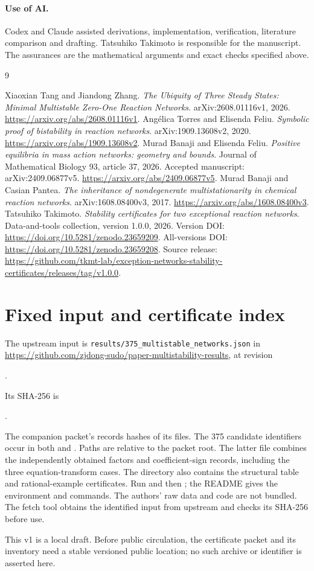 \documentclass[11pt,a4paper]{article}
\begin{document}
\paragraph{Use of AI.}
Codex and Claude assisted derivations, implementation, verification,
literature comparison and drafting. Tatsuhiko Takimoto is responsible
for the manuscript. The assurances are the mathematical arguments
and exact checks specified above.

\begin{thebibliography}{9}\raggedright
{}
Xiaoxian Tang and Jiandong Zhang.
\emph{The Ubiquity of Three Steady States: Minimal Multistable
Zero-One Reaction Networks}. arXiv:2608.01116v1, 2026.
\url{https://arxiv.org/abs/2608.01116v1}.
Ang\'elica Torres and Elisenda Feliu.
\emph{Symbolic proof of bistability in reaction networks}.
arXiv:1909.13608v2, 2020.
\url{https://arxiv.org/abs/1909.13608v2}.
Murad Banaji and Elisenda Feliu.
\emph{Positive equilibria in mass action networks: geometry and bounds}.
Journal of Mathematical Biology 93, article 37, 2026.
Accepted manuscript: arXiv:2409.06877v5.
\url{https://arxiv.org/abs/2409.06877v5}.
Murad Banaji and Casian Pantea.
\emph{The inheritance of nondegenerate multistationarity in chemical
reaction networks}. arXiv:1608.08400v3, 2017.
\url{https://arxiv.org/abs/1608.08400v3}.
Tatsuhiko Takimoto.
\emph{Stability certificates for two exceptional reaction networks}.
Data-and-tools collection, version 1.0.0, 2026.
Version DOI: \url{https://doi.org/10.5281/zenodo.23659209}.
All-versions DOI: \url{https://doi.org/10.5281/zenodo.23659208}.
Source release:
\url{https://github.com/tkmt-lab/exception-networks-stability-certificates/releases/tag/v1.0.0}.
\end{thebibliography}

\appendix
\section{Fixed input and certificate index}\label{app:input}
The upstream input is
\texttt{results/375\_multistable\_networks.json} in
\url{https://github.com/zjdong-sudo/paper-multistability-results},
at revision
\begin{center}\small
{}.
\end{center}
Its SHA-256 is
\begin{center}\small
{}.
\end{center}
The companion packet's  records hashes of its
files. The 375 candidate identifiers occur in both
 and
. Paths are relative to the
packet root. The latter file combines the independently obtained
factors and coefficient-sign records, including the three
equation-transform cases. The  directory also
contains the structural table and rational-example certificates.
Run  and then ; the README
gives the environment and commands. The authors' raw data and code
are not bundled. The fetch tool obtains the identified input from
upstream and checks its SHA-256 before use.

This v1 is a local draft. Before public circulation, the certificate
packet and its inventory need a stable versioned public location;
no such archive or identifier is asserted here.
\end{document}
